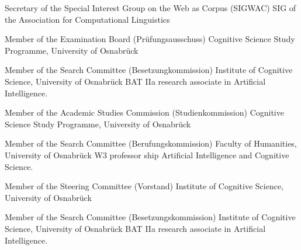 
        {Secretary of the Special Interest Group on the Web as Corpus (SIGWAC)}
        {}
        {SIG of the Association for Computational Linguistics}
        {}
        {}

        {Member of the Examination Board (Pr\"{u}fungsausschuss)}
        {}
        {Cognitive Science Study Programme, University of Osnabr\"{u}ck}
        {}
        {}

        {Member of the Search Committee (Besetzungkommission)}
        {}
        {Institute of Cognitive Science, University of Osnabr\"{u}ck}
        {}
        {BAT IIa research associate in Artificial Intelligence.}

        {Member of the Academic Studies Commission (Studienkommission)}
        {}
        {Cognitive Science Study Programme, University of Osnabr\"{u}ck}
        {}
        {}

        {Member of the Search Committee (Berufungskommission)}
        {}
        {Faculty of Humanities, University of Osnabr\"{u}ck}
        {}
        {W3 professor ship Artificial Intelligence and Cognitive Science.}

        {Member of the Steering Committee (Vorstand)}
        {}
        {Institute of Cognitive Science, University of Osnabr\"{u}ck}
        {}
        {}

        {Member of the Search Committee (Besetzungskommission)}
        {}
        {Institute of Cognitive Science, University of Osnabr\"{u}ck}
        {}
        {BAT IIa research associate in Artificial Intelligence.}



